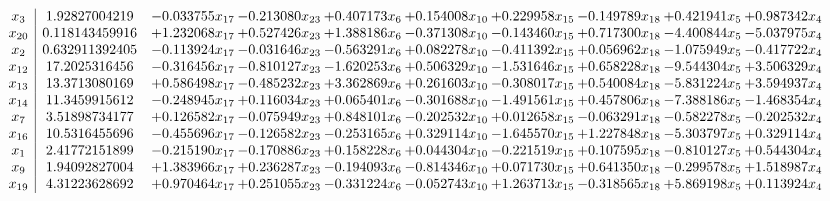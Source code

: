 \documentclass[10pt]{article}
\begin{document}
 \[\begin{array}{c| c c@{\hskip 2pt} c@{\hskip 2pt} c@{\hskip 2pt} c@{\hskip 2pt} c@{\hskip 2pt} c@{\hskip 2pt} c@{\hskip 2pt} c@{\hskip 2pt} }
 x_{3}   &  1.92827004219 & -0.033755 x_{17} & -0.213080 x_{23} & + 0.407173 x_{6} & + 0.154008 x_{10} & + 0.229958 x_{15} & -0.149789 x_{18} & + 0.421941 x_{5} & + 0.987342 x_{4}\\
 x_{20}   &  0.118143459916 & + 1.232068 x_{17} & + 0.527426 x_{23} & + 1.388186 x_{6} & -0.371308 x_{10} & -0.143460 x_{15} & + 0.717300 x_{18} & -4.400844 x_{5} & -5.037975 x_{4}\\
 x_{2}   &  0.632911392405 & -0.113924 x_{17} & -0.031646 x_{23} & -0.563291 x_{6} & + 0.082278 x_{10} & -0.411392 x_{15} & + 0.056962 x_{18} & -1.075949 x_{5} & -0.417722 x_{4}\\
 x_{12}   &  17.2025316456 & -0.316456 x_{17} & -0.810127 x_{23} & -1.620253 x_{6} & + 0.506329 x_{10} & -1.531646 x_{15} & + 0.658228 x_{18} & -9.544304 x_{5} & + 3.506329 x_{4}\\
 x_{13}   &  13.3713080169 & + 0.586498 x_{17} & -0.485232 x_{23} & + 3.362869 x_{6} & + 0.261603 x_{10} & -0.308017 x_{15} & + 0.540084 x_{18} & -5.831224 x_{5} & + 3.594937 x_{4}\\
 x_{14}   &  11.3459915612 & -0.248945 x_{17} & + 0.116034 x_{23} & + 0.065401 x_{6} & -0.301688 x_{10} & -1.491561 x_{15} & + 0.457806 x_{18} & -7.388186 x_{5} & -1.468354 x_{4}\\
 x_{7}   &  3.51898734177 & + 0.126582 x_{17} & -0.075949 x_{23} & + 0.848101 x_{6} & -0.202532 x_{10} & + 0.012658 x_{15} & -0.063291 x_{18} & -0.582278 x_{5} & -0.202532 x_{4}\\
 x_{16}   &  10.5316455696 & -0.455696 x_{17} & -0.126582 x_{23} & -0.253165 x_{6} & + 0.329114 x_{10} & -1.645570 x_{15} & + 1.227848 x_{18} & -5.303797 x_{5} & + 0.329114 x_{4}\\
 x_{1}   &  2.41772151899 & -0.215190 x_{17} & -0.170886 x_{23} & + 0.158228 x_{6} & + 0.044304 x_{10} & -0.221519 x_{15} & + 0.107595 x_{18} & -0.810127 x_{5} & + 0.544304 x_{4}\\
 x_{9}   &  1.94092827004 & + 1.383966 x_{17} & + 0.236287 x_{23} & -0.194093 x_{6} & -0.814346 x_{10} & + 0.071730 x_{15} & + 0.641350 x_{18} & -0.299578 x_{5} & + 1.518987 x_{4}\\
 x_{19}   &  4.31223628692 & + 0.970464 x_{17} & + 0.251055 x_{23} & -0.331224 x_{6} & -0.052743 x_{10} & + 1.263713 x_{15} & -0.318565 x_{18} & + 5.869198 x_{5} & + 0.113924 x_{4}\\

\end{array}\]
\end{document}
